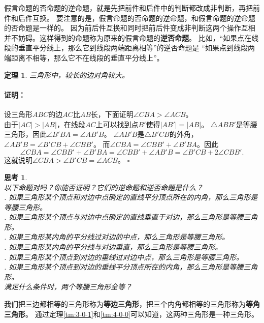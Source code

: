 \documentclass[12pt,UTF8]{ctexbook}
\newtheorem{tm}{定理}[section]
\newtheorem{sk}{思考}[section]
\newenvironment{proof2}{\paragraph{\textbf{证明：}}}{\hfill$\square$}
\begin{document}
假言命题的否命题的逆命题，就是先把前件和后件中的判断都改成非判断，再把前件和后件互换。
要注意的是，假言命题的否命题的逆命题，和假言命题的逆命题的否命题是一样的。
因为前后件互换和同时把前后件变成非判断这两个操作互相并不妨碍。这样得到的命题称为原来的假言命题的\textbf{逆否命题}。
比如，“如果点在线段的垂直平分线上，那么它到线段两端距离相等”的逆否命题是
“如果点到线段两端距离不相等，那么它不在线段的垂直平分线上”。

\begin{tm}\label{tm:4-0-1}
    三角形中，较长的边对角较大。
\end{tm}

\begin{proof2}
    设三角形$ABC$的边$AC$比$AB$长，下面证明$\angle CBA > \angle ACB$。\\
    由于$|AC| > |AB|$，在线段$AC$上可以找到点$B'$使得$|AB'| = |AB|$。
    $\triangle ABB'$是等腰三角形，因此$\angle B'BA = \angle AB'B$。
    $\angle AB'B$是$\triangle B'CB$的外角，$\angle AB'B = \angle B'CB + \angle CBB'$。
    而$\angle CBA = \angle CBB' + \angle B'BA$。因此
    $$ \angle CBA = \angle CBB' + \angle B'BA = \angle CBB' + \angle AB'B = \angle B'CB + 2\angle CBB'.$$
    这就说明$\angle CBA > \angle B'CB = \angle ACB$。
\end{proof2}

\begin{sk}\label{sk:4-0-0}
    \mbox{}\\
    以下命题对吗？你能否证明？它们的逆命题和逆否命題是什么？\\
    . 如果三角形某个顶点和对边中点确定的直线平分顶点所在的内角，那么三角形是等腰三角形。\\
    . 如果三角形某个顶点与对边中点确定的直线垂直于对边，那么三角形是等腰三角形。\\
    . 如果三角形某内角的平分线过对边的中点，那么三角形是等腰三角形。\\
    . 如果三角形某内角的平分线与对边垂直，那么三角形是等腰三角形。\\
    . 如果三角形某个顶点到对边的垂线过对边中点，那么三角形是等腰三角形。\\
    . 如果三角形某个顶点到对边的垂线平分顶点所在的内角，那么三角形是等腰三角形。\\
    满足什么条件时，两个等腰三角形全等？\\
\end{sk}

我们把三边都相等的三角形称为\textbf{等边三角形}，把三个内角都相等的三角形称为\textbf{等角三角形}。
通过定理\ref{tm:3-0-1}和\ref{tm:4-0-0}可以知道，这两种三角形是一种三角形。
\end{document}
